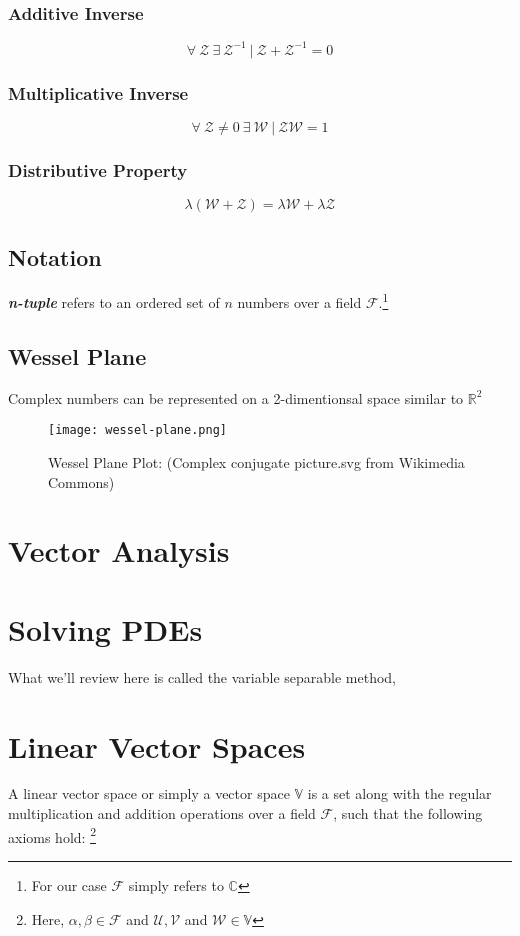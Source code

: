 \subsubsection{Additive Inverse}
$$\forall \ \mathcal{Z} \ \exists \ \mathcal{Z}^{-1} \ | \ \mathcal{Z} + \mathcal{Z}^{-1} = 0$$
\subsubsection{Multiplicative Inverse}
$$\forall \  \mathcal{Z} \neq 0 \ \exists \ \mathcal{W} \ | \ \mathcal{Z}\mathcal{W} = 1$$
\subsubsection{Distributive Property}
$$\lambda(\mathcal{W} + \mathcal{Z}) = \lambda\mathcal{W} + \lambda\mathcal{Z}$$
\subsection{Notation}
\textit{\textbf{n-tuple}} refers to an ordered set of $n$ numbers over a field $\mathcal{F}$.\footnote{For our case $\mathcal{F}$ simply refers to $\mathbb{C}$}
\subsection{Wessel Plane}
Complex numbers can be represented on a 2-dimentionsal space similar to $\mathbb{R}^{2}$
\begin{figure}
	\centering
	\texttt{[image: wessel-plane.png]}
	\caption{Wessel Plane Plot: (Complex conjugate picture.svg from Wikimedia Commons)}
\end{figure}
\section{Vector Analysis}
\section{Solving PDEs}
What we'll review here is called the variable separable method, 
\section{Linear Vector Spaces} 
A linear vector space or simply a vector space $\mathbb{V}$ is a set along with the regular multiplication and addition operations over a field $\mathcal{F}$, such that the following axioms hold: \footnote{Here, $\alpha , \beta \in \mathcal{F}$ and $\mathcal{U}, \mathcal{V} $ and $\mathcal{W} \in \mathbb{V}$} \\
